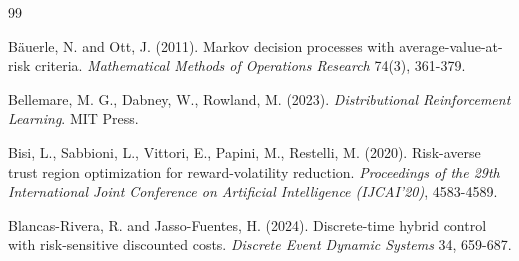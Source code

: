 \documentclass[12pt]{article}
\begin{document}
\begin{thebibliography}{99}


 B{\"a}uerle, N. and Ott, J. (2011). Markov decision processes with average-value-at-risk criteria. \emph{Mathematical Methods of Operations Research} 74(3), 361-379.

 Bellemare, M. G., Dabney, W., Rowland, M. (2023). \emph{Distributional Reinforcement Learning}. MIT Press.

 Bisi, L., Sabbioni, L., Vittori, E., Papini, M., Restelli, M. (2020). Risk-averse trust region optimization for reward-volatility reduction. \emph{Proceedings of the 29th International Joint Conference on Artificial Intelligence (IJCAI'20)}, 4583-4589.

 Blancas-Rivera, R. and Jasso-Fuentes, H. (2024). Discrete-time hybrid control with risk-sensitive discounted costs. \emph{Discrete Event Dynamic Systems} 34, 659-687.


\end{thebibliography}
\end{document}
